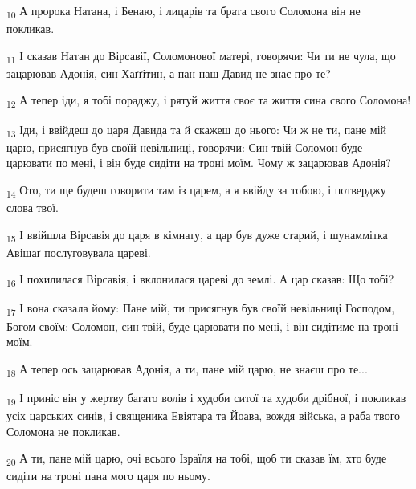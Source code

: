 \begin{tcolorbox}
\textsubscript{10} А пророка Натана, і Бенаю, і лицарів та брата свого Соломона він не покликав.
\end{tcolorbox}
\begin{tcolorbox}
\textsubscript{11} І сказав Натан до Вірсавії, Соломонової матері, говорячи: Чи ти не чула, що зацарював Адонія, син Хаґґітин, а пан наш Давид не знає про те?
\end{tcolorbox}
\begin{tcolorbox}
\textsubscript{12} А тепер іди, я тобі пораджу, і рятуй життя своє та життя сина свого Соломона!
\end{tcolorbox}
\begin{tcolorbox}
\textsubscript{13} Іди, і ввійдеш до царя Давида та й скажеш до нього: Чи ж не ти, пане мій царю, присягнув був своїй невільниці, говорячи: Син твій Соломон буде царювати по мені, і він буде сидіти на троні моїм. Чому ж зацарював Адонія?
\end{tcolorbox}
\begin{tcolorbox}
\textsubscript{14} Ото, ти ще будеш говорити там із царем, а я ввійду за тобою, і потверджу слова твої.
\end{tcolorbox}
\begin{tcolorbox}
\textsubscript{15} І ввійшла Вірсавія до царя в кімнату, а цар був дуже старий, і шунаммітка Авішаґ послуговувала цареві.
\end{tcolorbox}
\begin{tcolorbox}
\textsubscript{16} І похилилася Вірсавія, і вклонилася цареві до землі. А цар сказав: Що тобі?
\end{tcolorbox}
\begin{tcolorbox}
\textsubscript{17} І вона сказала йому: Пане мій, ти присягнув був своїй невільниці Господом, Богом своїм: Соломон, син твій, буде царювати по мені, і він сидітиме на троні моїм.
\end{tcolorbox}
\begin{tcolorbox}
\textsubscript{18} А тепер ось зацарював Адонія, а ти, пане мій царю, не знаєш про те...
\end{tcolorbox}
\begin{tcolorbox}
\textsubscript{19} І приніс він у жертву багато волів і худоби ситої та худоби дрібної, і покликав усіх царських синів, і священика Евіятара та Йоава, вождя війська, а раба твого Соломона не покликав.
\end{tcolorbox}
\begin{tcolorbox}
\textsubscript{20} А ти, пане мій царю, очі всього Ізраїля на тобі, щоб ти сказав їм, хто буде сидіти на троні пана мого царя по ньому.
\end{tcolorbox}
